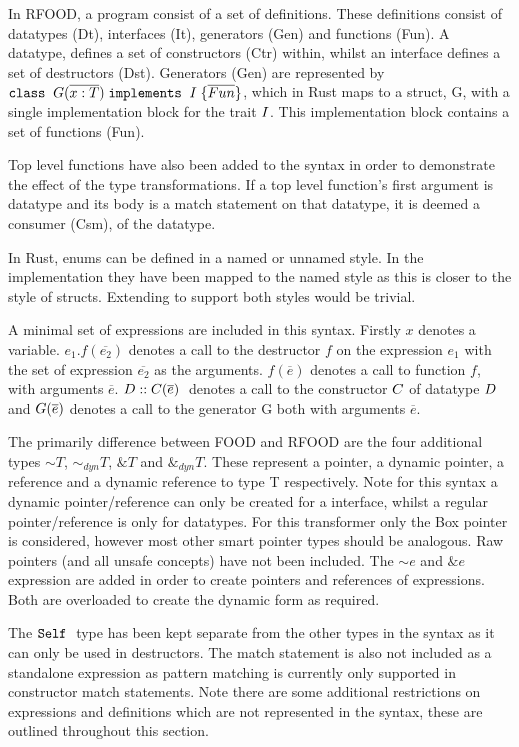 \documentclass[ oneside,%
                    author={James Elgar},
                    degree={MEng},
                     title={Bidirectional transformer between functional and \\ object-oriented programming in Rust},
                  subtitle={}]{dissertation}
\begin{document}
In RFOOD, a program consist of a set of definitions. These definitions consist of datatypes (Dt), interfaces (It), generators (Gen) and functions (Fun). A datatype, defines a set of constructors (Ctr) within, whilst an interface defines a set of destructors (Dst). Generators (Gen) are represented by $\texttt{class} \; \; {G} (\overline{{x} : {T}}) \; \texttt{implements} \; \; {I} \; \{ {{\overline{Fun}}} \}$, which in Rust maps to a struct, G, with a single implementation block for the trait $I$. This implementation block contains a set of functions (Fun).

Top level functions have also been added to the syntax in order to demonstrate the effect of the type transformations. If a top level function's first argument is datatype and its body is a match statement on that datatype, it is deemed a consumer (Csm), of the datatype.

In Rust, enums can be defined in a named or unnamed style. In the implementation they have been mapped to the named style as this is closer to the style of structs. Extending to support both styles would be trivial.

A minimal set of expressions are included in this syntax. Firstly $x$ denotes a variable. $e_1.f(\overline{e_2})$ denotes a call to the destructor $f$ on the expression $e_1$ with the set of expression $\overline{e_2}$ as the arguments. $f(\overline{e})$ denotes a call to function $f$, with arguments $\overline{e}$. $D::C(\overline{e}) \;$ denotes a call to the constructor $C$ of datatype $D$ and $G(\overline{e})$ denotes a call to the generator G both with arguments $\overline{e}$.

The primarily difference between FOOD and RFOOD are the four additional types $\sim T$, $\sim_{dyn} T$, $\& T$ and $\&_{dyn} T$. These represent a pointer, a dynamic pointer, a reference and a dynamic reference to type T respectively. Note for this syntax a dynamic pointer/reference can only be created for a interface, whilst a regular pointer/reference is only for datatypes. 
For this transformer only the Box pointer is considered, however most other smart pointer types should be analogous. Raw pointers (and all unsafe concepts) have not been included. The $\sim e$ and $\& e$ expression are added in order to create pointers and references of expressions. Both are overloaded to create the dynamic form as required.

The $\texttt{Self} \;$ type has been kept separate from the other types in the syntax as it can only be used in destructors. The match statement is also not included as a standalone expression as pattern matching is currently only supported in constructor match statements. Note there are some additional restrictions on expressions and definitions which are not represented in the syntax, these are outlined throughout this section.
\end{document}
